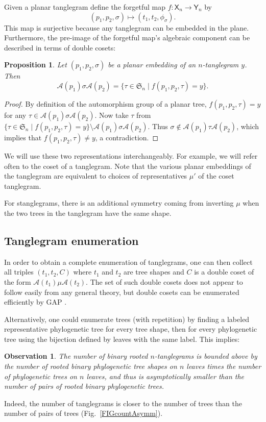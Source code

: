 \documentclass{amsart}
\newtheorem{proposition}{Proposition}
\newtheorem{observation}{Observation}
\newcommand{\fS}{\mathfrak S}
\newcommand{\aut}{\mathcal A}
\newcommand{\pairing}{\mu}
\newcommand{\ptangle}{\mathsf{X}}
\newcommand{\tangle}{\mathsf{Y}}
\begin{document}
Given a planar tanglegram define the forgetful map $f: \ptangle_n \rightarrow \tangle_n$ by
\begin{equation}
\label{eq:forgetful}
(p_1, p_2, \sigma) \mapsto (t_1, t_2, \phi_\sigma).
\end{equation}
This map is surjective because any tanglegram can be embedded in the plane.
Furthermore, the pre-image of the forgetful map's algebraic component can be described in terms of double cosets:
\begin{proposition}
\label{prop:doubleCosets}
Let $(p_1, p_2, \sigma)$ be a planar embedding of an $n$-tanglegram $y$. Then
\[
\aut(p_1) \sigma \aut(p_2) = \{\tau \in \fS_n \mid f(p_1, p_2, \tau) = y\}.
\]
\end{proposition}
\begin{proof}
By definition of the automorphism group of a planar tree, $f(p_1, p_2, \tau) = y$ for any $\tau \in \aut(p_1) \sigma \aut(p_2)$.
Now take $\tau$ from $\{\tau \in \fS_n \mid f(p_1, p_2, \tau) = y\} \setminus \aut(p_1) \sigma \aut(p_2)$.
Thus $\sigma \not \in \aut(p_1) \tau \aut(p_2)$, which implies that $f(p_1, p_2, \tau) \neq y$, a contradiction.
\end{proof}

We will use these two representations interchangeably.
For example, we will refer often to the coset of a tanglegram.
Note that the various planar embeddings of the tanglegram are equivalent to choices of representatives $\pairing'$ of the coset tanglegram.

For stanglegrams, there is an additional symmetry coming from inverting $\pairing$ when the two trees in the tanglegram have the same shape.


\subsection{Tanglegram enumeration}
In order to obtain a complete enumeration of tanglegrams, one can then collect all triples $(t_1, t_2, C)$ where $t_1$ and $t_2$ are tree shapes and $C$ is a double coset of the form $\aut(t_1) \pairing \aut(t_2)$.
The set of such double cosets does not appear to follow easily from any general theory, but double cosets can be enumerated efficiently by GAP \cite{GAP4}.

Alternatively, one could enumerate trees (with repetition) by finding a labeled representative phylogenetic tree for every tree shape, then for every phylogenetic tree using the bijection defined by leaves with the same label.
This implies:
\begin{observation}
\label{obs:count}
The number of binary rooted $n$-tanglegrams is bounded above by the number of rooted binary phylogenetic tree shapes on $n$ leaves times the number of phylogenetic trees on $n$ leaves, and thus is asymptotically smaller than the number of pairs of rooted binary phylogenetic trees.
\end{observation}
Indeed, the number of tanglegrams is closer to the number of trees than the number of pairs of trees (Fig.~\ref{FIGcountAsymm}).
\end{document}
